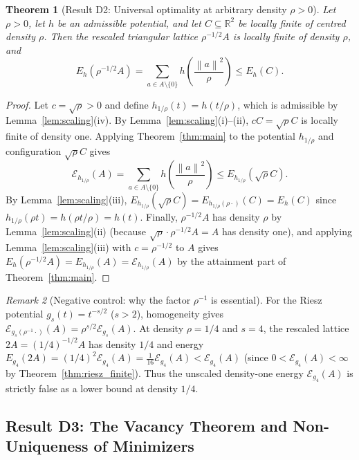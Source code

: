 \documentclass[11pt, a4paper]{article}
\newtheorem{theorem}{Theorem}[section]
\theoremstyle{definition}
\theoremstyle{remark}
\newtheorem{remark}[theorem]{Remark}
\newcommand{\R}{\mathbb{R}}
\newcommand{\Ecal}{\mathcal{E}}
\newcommand{\norm}[1]{\left\lVert #1 \right\rVert}
\begin{document}
\begin{theorem}[Result D2: Universal optimality at arbitrary density $\rho > 0$]
\label{thm:D2}
Let $\rho > 0$, let $h$ be an admissible potential, and let $C \subseteq \R^2$ be locally finite of centred density $\rho$. Then the rescaled triangular lattice $\rho^{-1/2} A$ is locally finite of density $\rho$, and
\[
E_h\left(\rho^{-1/2} A\right) = \sum_{a \in A \setminus \{0\}} h\left(\frac{\norm{a}^2}{\rho}\right) \le E_h(C).
\]
\end{theorem}

\begin{proof}
Let $c = \sqrt{\rho} > 0$ and define $h_{1/\rho}(t) = h(t/\rho)$, which is admissible by Lemma~\ref{lem:scaling}(iv). By Lemma~\ref{lem:scaling}(i)--(ii), $c C = \sqrt{\rho} C$ is locally finite of density one. Applying Theorem~\ref{thm:main} to the potential $h_{1/\rho}$ and configuration $\sqrt{\rho} C$ gives
\[
\Ecal_{h_{1/\rho}}(A) = \sum_{a \in A \setminus \{0\}} h\left(\frac{\norm{a}^2}{\rho}\right) \le E_{h_{1/\rho}}\left(\sqrt{\rho} C\right).
\]
By Lemma~\ref{lem:scaling}(iii), $E_{h_{1/\rho}}(\sqrt{\rho} C) = E_{h_{1/\rho}(\rho \cdot)}(C) = E_h(C)$ since $h_{1/\rho}(\rho t) = h(\rho t / \rho) = h(t)$. Finally, $\rho^{-1/2} A$ has density $\rho$ by Lemma~\ref{lem:scaling}(ii) (because $\sqrt{\rho} \cdot \rho^{-1/2} A = A$ has density one), and applying Lemma~\ref{lem:scaling}(iii) with $c = \rho^{-1/2}$ to $A$ gives $E_h(\rho^{-1/2} A) = E_{h_{1/\rho}}(A) = \Ecal_{h_{1/\rho}}(A)$ by the attainment part of Theorem~\ref{thm:main}.
\end{proof}

\begin{remark}[Negative control: why the factor $\rho^{-1}$ is essential]
For the Riesz potential $g_s(t) = t^{-s/2}$ ($s > 2$), homogeneity gives $\Ecal_{g_s(\rho^{-1} \cdot)}(A) = \rho^{s/2} \Ecal_{g_s}(A)$. At density $\rho = 1/4$ and $s = 4$, the rescaled lattice $2A = (1/4)^{-1/2} A$ has density $1/4$ and energy $E_{g_4}(2A) = (1/4)^2 \Ecal_{g_4}(A) = \frac{1}{16} \Ecal_{g_4}(A) < \Ecal_{g_4}(A)$ (since $0 < \Ecal_{g_4}(A) < \infty$ by Theorem~\ref{thm:riesz_finite}). Thus the unscaled density-one energy $\Ecal_{g_4}(A)$ is strictly false as a lower bound at density $1/4$.
\end{remark}

\subsection{Result D3: The Vacancy Theorem and Non-Uniqueness of Minimizers}
\end{document}
